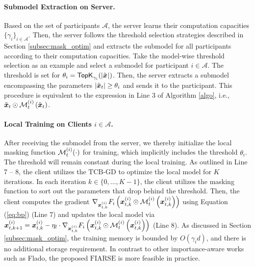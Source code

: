 \documentclass{article}
\theoremstyle{plain}
\theoremstyle{definition}
\theoremstyle{remark}
\newcommand{\algo}{\ensuremath{\text{FIARSE}}\xspace}
\newcommand{\module}{\ensuremath{\text{TCB-GD}}\xspace}
\renewcommand{\eqref}[1]{Equation (\ref{#1})}
\newcommand{\bracket}[1]{\left(#1\right)}
\begin{document}
\newcommand{\participant}{\mathcal{A}}

\paragraph{Submodel Extraction on Server.} 
Based on the set of participants $\mathcal{A}$, the server learns their computation capacities $\{\gamma_i\}_{i\in \mathcal{A}}$. Then, the server follows the threshold selection strategies described in Section \ref{subsec:mask_optim} and extracts the submodel for all participants according to their computation capacities. Take the model-wise threshold selection as an example and select a submodel for participant $i \in \participant$. The threshold is set for $\theta_i = \textsf{TopK}_{\gamma_i}(|\x{}|)$. Then, the server extracts a submodel encompassing the parameters $|\x{t}| \geq \theta_i$ and sends it to the participant. This procedure is equivalent to the expression in Line 3 of Algorithm \ref{algo}, i.e., $\x{t} \odot \mask{i}{t}\bracket{\x{t}}$. 


\newcommand{\agg}[1]{\textsf{Agg}_{#1}}
\paragraph{Local Training on Clients $i \in \participant$.} 
After receiving the submodel from the server, we thereby initialize the local masking function $\mask{i}{t}(\cdot)$ for training, which implicitly includes the threshold $\theta_i$. The threshold will remain constant during the local training. As outlined in Line 7 -- 8, the client utilizes the \module to optimize the local model for $K$ iterations. In each iteration $k \in \{0, \dots, K-1\}$, the client utilizes the masking function to sort out the parameters that drop behind the threshold. Then, the client computes the gradient $\nabla_{\x{i}{t}{k}} F_i\bracket{\x{i}{t}{k} \odot \mask{i}{t}\bracket{\x{i}{t}{k}}}$ using \eqref{eq:bp} (Line 7) and updates the local model via $\x{i}{t}{k+1} = \x{i}{t}{k} - \eta_l \cdot \nabla_{\x{i}{t}{k}} F_i\bracket{\x{i}{t}{k} \odot \mask{i}{t}\bracket{\x{i}{t}{k}}}$ (Line 8). As discussed in Section \ref{subsec:mask_optim}, the training memory is bounded by $O(\gamma_i d)$, and there is no additional storage requirement. In contrast to other importance-aware works such as Flado, the proposed \algo is more feasible in practice. 

\newcommand{\n}[1]{N_{\gamma_{#1}'}}
\renewcommand{\a}[1]{\participant_{\gamma_{#1}'}}
\newcommand{\partialgrad}[3]{\nabla F_{#1}^{[\gamma_{#2 - 1}':\gamma_{#2}']} \bracket{#3}}
\end{document}
